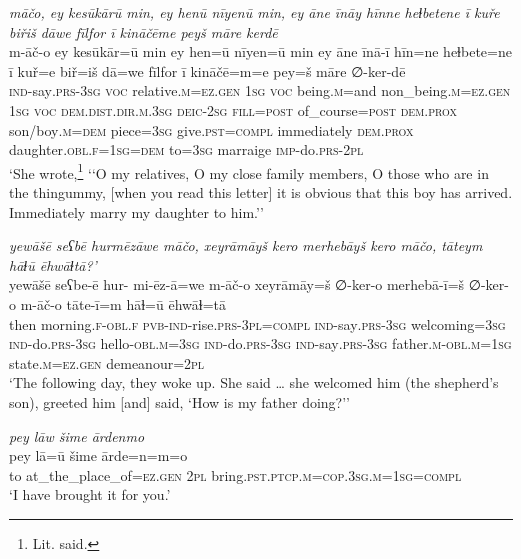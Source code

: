 \ea \label{KŠ.80}
\textit{māčo, ey kesūkārū min, ey henū nīyenū min, ey āne īnāy hīnne heɫbetene ī kuře biřiš dāwe fīlfor ī kināčēme peyš māre kerdē} \\ 
\gll m-āč-o ey kesūkār=ū min ey hen=ū nīyen=ū min ey āne īnā-ī hīn=ne heɫbete=ne ī kuř=e biř=iš dā=we fīlfor ī kināčē=m=e pey=š māre ∅-ker-dē \\ 
 \textsc{ind-}say\textsc{.prs}\textsc{-3sg} \textsc{voc} relative\textsc{.m}\textsc{\textsc{=ez.gen}} \textsc{1sg} \textsc{voc} being\textsc{.m}=and non\_being\textsc{.m}\textsc{\textsc{=ez.gen}} \textsc{1sg} \textsc{voc} \textsc{dem.dist}\textsc{.dir}\textsc{.m}\textsc{.3sg} \textsc{deic}-\textsc{2sg} \textsc{fill}\textsc{=\textsc{post}} of\_course\textsc{=\textsc{post}} \textsc{dem.prox} son/boy\textsc{.m}\textsc{=dem} piece\textsc{=3sg} give\textsc{.pst}\textsc{=compl} immediately \textsc{dem.prox} daughter\textsc{.obl}\textsc{.f}\textsc{=\textsc{1sg}}\textsc{=dem} to\textsc{=3sg} marraige \textsc{imp-}do\textsc{.prs}-\textsc{2pl} \\ 
\glt `She wrote,\footnote{Lit. said.} ‘‘O my relatives, O my close family members, O those who are in the thingummy, [when you read this letter] it is obvious that this boy has arrived. Immediately marry my daughter to him.’'
\z 
 
\ea \label{KŠ.81}
\textit{yewāšē seʕbē hurmēzāwe māčo, xeyrāmāyš kero merhebāyš kero māčo, tāteym hāɫū ēhwāɫtā?’} \\ 
\gll yewāšē seʕbe-ē hur- mi-ēz-ā=we m-āč-o xeyrāmāy=š ∅-ker-o merhebā-ī=š ∅-ker-o m-āč-o tāte-ī=m hāɫ=ū ēhwāɫ=tā \\ 
 then morning\textsc{.f}\textsc{-obl}\textsc{.f} \textsc{pvb-}\textsc{ind-}rise\textsc{.prs}\textsc{-3pl}\textsc{=compl} \textsc{ind-}say\textsc{.prs}\textsc{-3sg} welcoming\textsc{=3sg} \textsc{ind-}do\textsc{.prs}\textsc{-3sg} hello\textsc{-obl}\textsc{.m}\textsc{=3sg} \textsc{ind-}do\textsc{.prs}\textsc{-3sg} \textsc{ind-}say\textsc{.prs}\textsc{-3sg} father\textsc{.m}\textsc{-obl}\textsc{.m}\textsc{=\textsc{1sg}} state\textsc{.m}\textsc{\textsc{=ez.gen}} demeanour=\textsc{2pl} \\ 
\glt `The following day, they woke up. She said … she welcomed him (the shepherd’s son), greeted him [and] said, ‘How is my father doing?’'
\z 
 
\ea \label{KŠ.85}
\textit{pey lāw šime ārdenmo} \\ 
\gll pey lā=ū šime ārde=n=m=o \\ 
 to at\_the\_place\_of\textsc{\textsc{=ez.gen}} \textsc{2pl} bring\textsc{.pst}\textsc{.ptcp}\textsc{.m}\textsc{=cop}\textsc{.3sg}\textsc{.m}\textsc{=\textsc{1sg}}\textsc{=compl} \\ 
\glt `I have brought it for you.'
\z 
 
